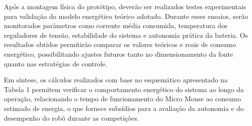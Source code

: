 Após a montagem física do protótipo, deverão ser realizados testes experimentais 
para validação do modelo energético teórico adotado. Durante esses ensaios, 
serão monitorados parâmetros como corrente média consumida, temperatura dos 
reguladores de tensão, estabilidade do sistema e autonomia prática da bateria. Os 
resultados obtidos permitirão comparar os valores teóricos e reais de consumo 
energético, possibilitando ajustes futuros tanto no dimensionamento da fonte 
quanto nas estratégias de controle.

Em síntese, os cálculos realizados com base no esquemático apresentado na 
Tabela 1 permitem verificar o comportamento energético do sistema ao longo da 
operação, relacionando o tempo de funcionamento do Micro Mouse ao consumo 
estimado de energia, o que fornece subsídios para a avaliação da autonomia e do 
desempenho do robô durante as competições.

